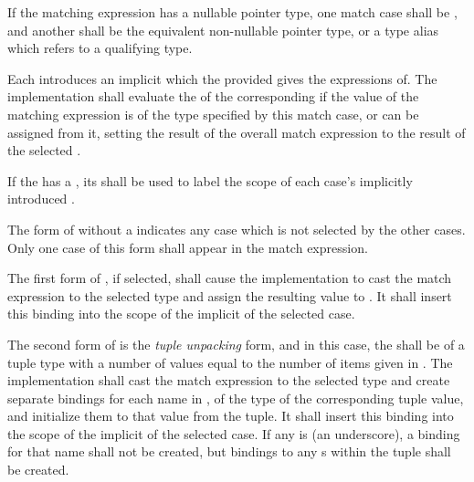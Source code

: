 \specsubsubitem
If the matching expression has a nullable pointer type, one match case shall be
, and another shall be the equivalent non-nullable pointer type,
or a type alias which refers to a qualifying type.

\specsubsubitem
Each  introduces an implicit
 which the provided
 gives the expressions of. The implementation
shall evaluate the  of the corresponding
 if the value of the matching expression is of the type
specified by this match case, or can be assigned from it, setting the result of
the overall match expression to the result of the selected
.



\specsubsubitem
If the  has a , its
 shall be used to label the scope of each case's implicitly
introduced .

\specsubsubitem
The form of  without a  indicates any
case which is not selected by the other cases. Only one case of this form shall
appear in the match expression.

\specsubsubitem
The first form of , if selected, shall cause the
implementation to cast the match expression to the selected type and assign the
resulting value to . It shall insert this binding into the
scope of the implicit  of the selected case.

\specsubsubitem
The second form of  is the \textit{tuple unpacking}
form, and in this case, the  shall be of a tuple type
with a number of values equal to the number of items given in
. The implementation shall cast the match expression
to the selected type and create separate bindings for each name in
, of the type of the corresponding tuple value, and
initialize them to that value from the tuple. It shall insert this binding into
the scope of the implicit  of the selected
case. If any  is \terminal{\_} (an underscore),
a binding for that name shall not be created, but bindings
to any s within the tuple shall be created.

